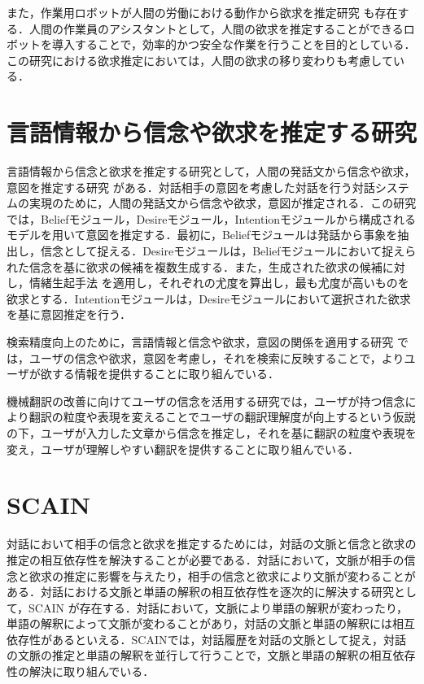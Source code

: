 \par
また，作業用ロボットが人間の労働における動作から欲求を推定研究 \cite{inbook}も存在する．人間の作業員のアシスタントとして，人間の欲求を推定することができるロボットを導入することで，効率的かつ安全な作業を行うことを目的としている．この研究における欲求推定においては，人間の欲求の移り変わりも考慮している．

\section{言語情報から信念や欲求を推定する研究}
\par
言語情報から信念と欲求を推定する研究として，人間の発話文から信念や欲求，意図を推定する研究 \cite{高橋拓誠2015bdi}がある．対話相手の意図を考慮した対話を行う対話システムの実現のために，人間の発話文から信念や欲求，意図が推定される．この研究では，Beliefモジュール，Desireモジュール，Intentionモジュールから構成されるモデルを用いて意図を推定する．最初に，Beliefモジュールは発話から事象を抽出し，信念として捉える．Desireモジュールは，Beliefモジュールにおいて捉えられた信念を基に欲求の候補を複数生成する．また，生成された欲求の候補に対し，情緒生起手法 \cite{2002}を適用し，それぞれの尤度を算出し，最も尤度が高いものを欲求とする．Intentionモジュールは，Desireモジュールにおいて選択された欲求を基に意図推定を行う．

\par
検索精度向上のために，言語情報と信念や欲求，意図の関係を適用する研究 \cite{10.1007/978-3-642-02481-8_4}では，ユーザの信念や欲求，意図を考慮し，それを検索に反映することで，よりユーザが欲する情報を提供することに取り組んでいる．

\par
機械翻訳の改善に向けてユーザの信念を活用する研究\cite{farwell1997user}では，ユーザが持つ信念により翻訳の粒度や表現を変えることでユーザの翻訳理解度が向上するという仮説の下，ユーザが入力した文章から信念を推定し，それを基に翻訳の粒度や表現を変え，ユーザが理解しやすい翻訳を提供することに取り組んでいる．

\section{SCAIN}
対話において相手の信念と欲求を推定するためには，対話の文脈と信念と欲求の推定の相互依存性を解決することが必要である．対話において，文脈が相手の信念と欲求の推定に影響を与えたり，相手の信念と欲求により文脈が変わることがある．対話における文脈と単語の解釈の相互依存性を逐次的に解決する研究として，SCAIN \cite{takimoto2020slaminspired}が存在する．対話において，文脈により単語の解釈が変わったり，単語の解釈によって文脈が変わることがあり，対話の文脈と単語の解釈には相互依存性があるといえる．SCAINでは，対話履歴を対話の文脈として捉え，対話の文脈の推定と単語の解釈を並行して行うことで，文脈と単語の解釈の相互依存性の解決に取り組んでいる．

